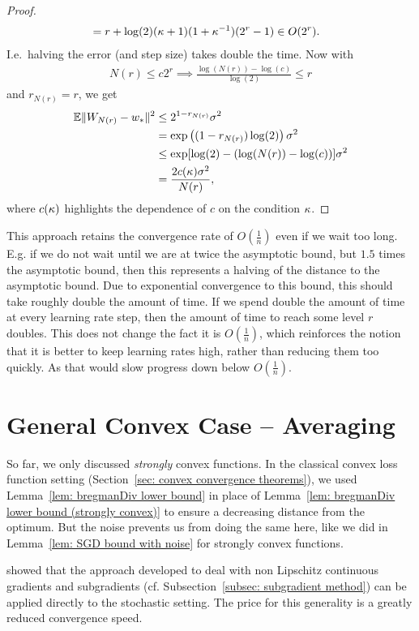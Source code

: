 \begin{proof}
\begin{align*}
		&=r+\log(2)(\kappa+1)(1+\kappa^{-1})(2^r-1) \in O(2^r).
	\end{align*}
	I.e.\ halving the error (and step size) takes double the time. Now with
	\begin{align*}
		N(r) \le c2^r \implies \frac{\log(N(r)) - \log(c)}{\log(2)} \le r
	\end{align*}
	and \(r_{N(r)} = r\), we get
	\begin{align*}
		\mathbb{E}\|W_{N(r)}-w_*\|^2 
		&\le 2^{1-r_{N(r)}}\sigma^2\\
		&= \exp\left((1-r_{N(r)})\log(2)\right)\sigma^2\\
		&\le \exp[\log(2)- (\log(N(r)) - \log(c))]\sigma^2\\
		&=  \frac{2c(\kappa)\sigma^2}{N(r)},
	\end{align*}
	where \(c(\kappa)\) highlights the dependence of \(c\) on the condition
	\(\kappa\).
\end{proof}

This approach retains the convergence rate of \(O(\tfrac1n)\) even if we wait too long.
E.g. if we do not wait until we are at twice the asymptotic bound, but \(1.5\)
times the asymptotic bound, then this represents a halving of the distance to
the asymptotic bound. Due to exponential convergence to this bound, this should
take roughly double the amount of time. If we spend double the amount of time at
every learning rate step, then the amount of time to reach some level \(r\)
doubles. This does not change the fact it is \(O(\tfrac1n)\),
which reinforces the notion that it is better to keep learning rates high,
rather than reducing them too quickly. As that would slow progress down below
\(O(\tfrac1n)\).

\section{General Convex Case -- Averaging}\label{sec: SGD with Averaging}

So far, we only discussed \emph{strongly} convex functions. In the classical
convex loss function setting (Section~\ref{sec: convex convergence theorems}),
we used Lemma~\ref{lem: bregmanDiv lower bound} in place of Lemma~\ref{lem:
bregmanDiv lower bound (strongly convex)} to ensure a decreasing distance from
the optimum. But the noise prevents us from doing the same here, like we did in
Lemma~\ref{lem: SGD bound with noise} for strongly convex functions.

\textcite{nemirovskiRobustStochasticApproximation2009} showed that the approach
developed to deal with non Lipschitz continuous gradients and subgradients (cf.
Subsection~\ref{subsec: subgradient method}) can be applied directly to the
stochastic setting. The price for this generality is a greatly reduced
convergence speed.

